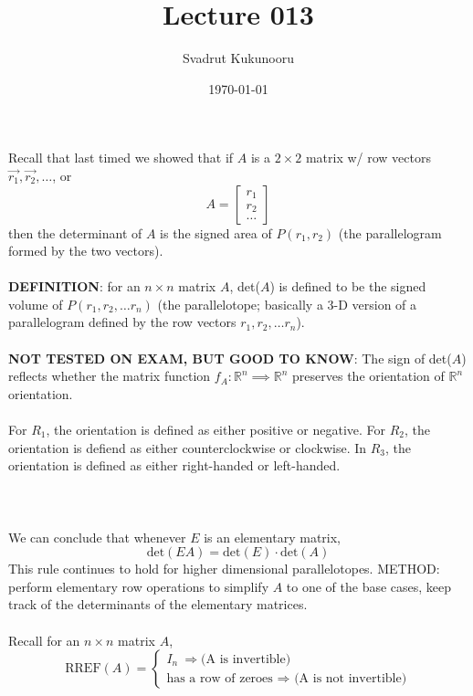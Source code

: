 \documentclass[letterpaper]{report}
\title{Lecture 013}
\author{Svadrut Kukunooru}
\date{\today}
\begin{document}
\begin{titlepage}
    \maketitle
\end{titlepage}
Recall that last timed we showed that if $A$ is a $2\times 2$ matrix w/ row vectors $\vec{r_1}, \vec{r_2}, \ldots$, or \[A = \begin{bmatrix} 
r_1 \\ r_2 \\ \ldots 
\end{bmatrix} \]
then the determinant of $A$ is the signed area of $P(r_1, r_2)$ (the parallelogram formed by the two vectors). 
\\ \\ 
\textbf{DEFINITION}: for an $n \times n$ matrix $A$, det($A$) is defined to be the signed volume of $P(r_1, r_2, \ldots r_n)$ (the parallelotope; basically a 3-D version of a parallelogram defined by the row vectors $r_1, r_2, \ldots r_n$). 
\\ \\ 
\textbf{NOT TESTED ON EXAM, BUT GOOD TO KNOW}: The sign of det($A$) reflects whether the matrix function $f_A: \mathbb{R}^n \implies \mathbb{R}^n$ preserves the orientation of $\mathbb{R}^n$ orientation. \\ \\ 
For $R_1$, the orientation is defined as either positive or negative. For $R_2$, the orientation is defiend as either counterclockwise or clockwise. In $R_3$, the orientation is defined as either right-handed or left-handed. \\ \\ 
\\ \\ 
We can conclude that whenever $E$ is an elementary matrix, 
\[
    \text{det}(EA) = \text{det}(E) \cdot \text{det}(A)
\] 
This rule continues to hold for higher dimensional parallelotopes. METHOD: perform elementary row operations to simplify $A$ to one of the base cases, keep track of the determinants of the elementary matrices. 
\\ \\ 
Recall for an $n \times  n$ matrix $A$, 
\[
    \text{RREF}(A) = 
    \begin{cases}
             I_n\ \Rightarrow \text{(A is invertible)} 
             \\
             \text{has a row of zeroes $\Rightarrow$ (A is not invertible)}
    \end{cases}
\] 
\end{document}
